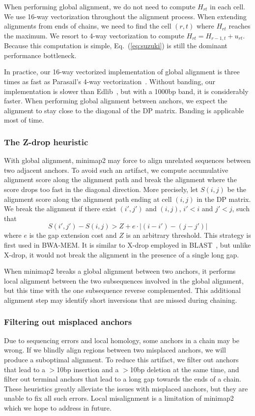 \documentclass{bioinfo}
\begin{document}
\begin{methods}
When performing global alignment, we do not need to compute $H_{rt}$ in each cell.
We use 16-way vectorization throughout the alignment process. When extending
alignments from ends of chains, we need to find the cell $(r,t)$ where $H_{rt}$
reaches the maximum. We resort to 4-way vectorization to compute
$H_{rt}=H_{r-1,t}+u_{rt}$. Because this computation is simple,
Eq.~(\ref{eq:suzuki}) is still the dominant performance bottleneck.

In practice, our 16-way vectorized implementation of global alignment is three
times as fast as Parasail's 4-way vectorization~\citep{Daily:2016aa}.  Without
banding, our implementation is slower than Edlib~\citep{Sosic:2017aa}, but with
a 1000bp band, it is considerably faster. When performing global alignment
between anchors, we expect the alignment to stay close to the diagonal of the
DP matrix. Banding is applicable most of time.

\subsubsection{The Z-drop heuristic}

With global alignment, minimap2 may force to align unrelated sequences between
two adjacent anchors. To avoid such an artifact, we compute accumulative
alignment score along the alignment path and break the alignment where the
score drops too fast in the diagonal direction. More precisely, let $S(i,j)$ be
the alignment score along the alignment path ending at cell $(i,j)$ in the DP
matrix. We break the alignment if there exist $(i',j')$ and $(i,j)$, $i'<i$ and
$j'<j$, such that
\[
S(i',j')-S(i,j)>Z+e\cdot|(i-i')-(j-j')|
\]
where $e$ is the gap extension cost and $Z$ is an arbitrary threshold.
This strategy is first used in BWA-MEM. It is similar to X-drop employed in
BLAST~\citep{Altschul:1997vn}, but unlike X-drop, it would not break the
alignment in the presence of a single long gap.

When minimap2 breaks a global alignment between two anchors, it performs local
alignment between the two subsequences involved in the global alignment, but
this time with the one subsequence reverse complemented. This additional
alignment step may identify short inversions that are missed during chaining.

\subsubsection{Filtering out misplaced anchors}
Due to sequencing errors and local homology, some anchors in a chain may be
wrong. If we blindly align regions between two misplaced anchors, we will
produce a suboptimal alignment. To reduce this artifact, we filter out
anchors that lead to a $>$10bp insertion and a $>$10bp deletion at the same
time, and filter out terminal anchors that lead to a long gap towards the ends
of a chain. These heuristics greatly alleviate the issues with misplaced
anchors, but they are unable to fix all such errors. Local misalignment is a
limitation of minimap2 which we hope to address in future.


\end{methods}
\end{document}

